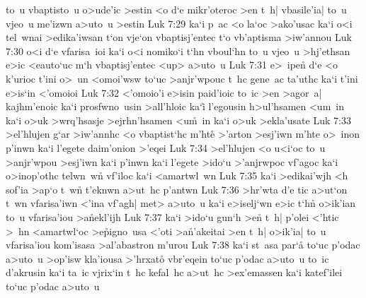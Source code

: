 to~u
vbaptisto~u
o>ude'ic
>estin
<o
d`e
mikr'oteroc
>en
t~h|
vbasile'ia|
to~u
vjeo~u
me'izwn
a>uto~u
>estin\bibvsend
\vs Luk 7:29
ka`i
p~ac
<o
la`oc
>ako'usac
ka`i
o<i
tel~wnai
>edika'iwsan
t`on
vje`on
vbaptisj'entec
t`o
vb'aptisma
>iw'annou\bibvsend
\vs Luk 7:30
o<i
d`e
vfarisa~ioi
ka`i
o<i
nomiko`i
t`hn
vboul`hn
to~u
vjeo~u
>hj'ethsan
e>ic
<eauto`uc
m`h
vbaptisj'entec
<up>
a>uto~u\bibvsend
\vs Luk 7:31
e>~ipen\r{}
d`e
<o
k'urioc
t'ini
o>~un
<omoi'wsw
to`uc
>anjr'wpouc
t~hc
gene~ac
ta'uthc
ka`i
t'ini
e>is`in
<'omoioi\bibvsend
\vs Luk 7:32
<'omoio'i
e>isin
paid'ioic
to~ic
>en
>agor~a|
kajhm'enoic
ka`i
prosfwno~usin
>all'hloic
ka`i\r{}
l'egousin
h>ul'hsamen
<um~in
ka`i
o>uk
>wrq'hsasje
>ejrhn'hsamen
<u\r{m}~in
ka`i
o>uk
>ekla'usate\bibvsend
\vs Luk 7:33
>el'hlujen
g`ar
>iw'annhc
<o
vbaptist`hc
m'hte\r{}
>'arton
>esj'iwn
m'hte
o>~inon
p'inwn
ka`i
l'egete
daim'onion
>'eqei\bibvsend
\vs Luk 7:34
>el'hlujen
<o
u<i`oc
to~u
>anjr'wpou
>esj'iwn
ka`i
p'inwn
ka`i
l'egete
>ido`u
>'anjrwpoc
vf'agoc
ka`i
o>inop'othc
telwn~wn\r{}
vf'iloc
ka`i
<amartwl~wn\bibvsend
\vs Luk 7:35
ka`i
>edikai'wjh
<h
sof'ia
>ap`o
t~wn\r{}
t'eknwn
a>ut~hc
p'antwn\bibvsend
\vs Luk 7:36
>hr'wta
d'e
tic
a>ut`on
t~wn
vfarisa'iwn
<'ina
vf'agh|
met>
a>uto~u
ka`i
e>iselj`wn
e>ic
t`hn\r{}
o>ik'ian
to~u
vfarisa'iou
>a\r{n}ekl'ijh\bibvsend
{}
\vs Luk 7:37
ka`i
>ido`u
gun`h
>en\r{}
t~h|
p'olei
<'htic
>~hn
<amartwl`oc
>e\r{p}igno~usa
<'oti
>a\r{n}'akeitai
>en
t~h|
o>ik'ia|
to~u
vfarisa'iou
kom'isasa
>al'abastron
m'urou\bibvsend
\vs Luk 7:38
ka`i
st~asa
par`a\r{}
to`uc
p'odac
a>uto~u
>op'isw
kla'iousa
>'hrxato\r{}
vbr'eqein
to`uc
p'odac
a>uto~u
to~ic
d'akrusin
ka`i
ta~ic
vjrix`in
t~hc
kefal~hc
a>ut~hc
>ex'emassen
ka`i
katef'ilei
to`uc
p'odac
a>uto~u
